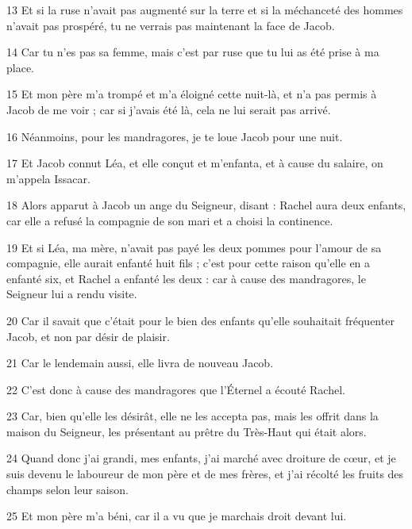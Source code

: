 \par 13 Et si la ruse n'avait pas augmenté sur la terre et si la méchanceté des hommes n'avait pas prospéré, tu ne verrais pas maintenant la face de Jacob.

\par 14 Car tu n'es pas sa femme, mais c'est par ruse que tu lui as été prise à ma place.

\par 15 Et mon père m'a trompé et m'a éloigné cette nuit-là, et n'a pas permis à Jacob de me voir ; car si j'avais été là, cela ne lui serait pas arrivé.

\par 16 Néanmoins, pour les mandragores, je te loue Jacob pour une nuit.

\par 17 Et Jacob connut Léa, et elle conçut et m'enfanta, et à cause du salaire, on m'appela Issacar.

\par 18 Alors apparut à Jacob un ange du Seigneur, disant : Rachel aura deux enfants, car elle a refusé la compagnie de son mari et a choisi la continence.

\par 19 Et si Léa, ma mère, n'avait pas payé les deux pommes pour l'amour de sa compagnie, elle aurait enfanté huit fils ; c'est pour cette raison qu'elle en a enfanté six, et Rachel a enfanté les deux : car à cause des mandragores, le Seigneur lui a rendu visite.

\par 20 Car il savait que c'était pour le bien des enfants qu'elle souhaitait fréquenter Jacob, et non par désir de plaisir.

\par 21 Car le lendemain aussi, elle livra de nouveau Jacob.

\par 22 C'est donc à cause des mandragores que l'Éternel a écouté Rachel.

\par 23 Car, bien qu'elle les désirât, elle ne les accepta pas, mais les offrit dans la maison du Seigneur, les présentant au prêtre du Très-Haut qui était alors.

\par 24 Quand donc j'ai grandi, mes enfants, j'ai marché avec droiture de cœur, et je suis devenu le laboureur de mon père et de mes frères, et j'ai récolté les fruits des champs selon leur saison.

\par 25 Et mon père m'a béni, car il a vu que je marchais droit devant lui.

